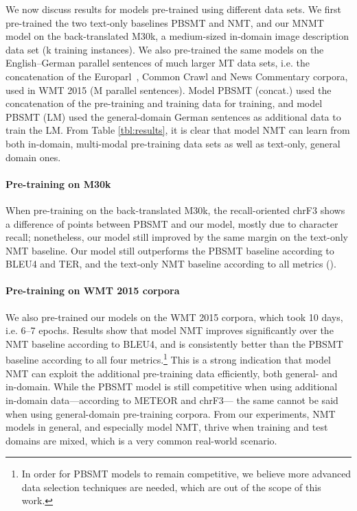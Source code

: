 \documentclass[11pt]{article}
\begin{document}
We now discuss results for models pre-trained using different data sets.
We first pre-trained the two text-only baselines PBSMT and NMT, and our MNMT model on the back-translated M30k, a medium-sized in-domain image description data set (k training instances).
We also pre-trained the same models on the English--German parallel sentences of much larger MT data sets, i.e. the concatenation of the Europarl~\cite{Koehn2005}, Common Crawl and News Commentary corpora, used in WMT 2015 (M parallel sentences).
Model PBSMT (concat.) used the concatenation of the pre-training and training data for training, and model PBSMT (LM) used the general-domain German sentences as additional data to train the LM.
From Table \ref{tbl:results}, it is clear that model NMT can learn from both in-domain, multi-modal pre-training data sets as well as text-only, general domain ones.


\paragraph{Pre-training on M30k}

When pre-training on the back-translated M30k, the recall-oriented chrF3 shows a difference of  points between PBSMT and our model, mostly due to character recall; nonetheless, our model still improved by the same margin on the text-only NMT baseline.
Our model still outperforms the PBSMT baseline according to BLEU4 and TER, and the text-only NMT baseline according to all metrics ().


\paragraph{Pre-training on WMT 2015 corpora}

We also pre-trained our models on the WMT 2015 corpora, which took 10 days, i.e. 6--7 epochs.
Results show that model NMT improves significantly over the NMT baseline according to BLEU4, and is consistently better than the PBSMT baseline according to all four metrics.\footnote{In order for PBSMT models to remain competitive, we believe more advanced data selection techniques are needed, which are out of the scope of this work.}
This is a strong indication that model NMT can exploit the additional pre-training data efficiently, both general- and in-domain.
While the PBSMT model is still competitive when using additional in-domain data---according to METEOR and chrF3--- the same cannot be said when using general-domain pre-training corpora.
From our experiments, NMT models in general, and especially model NMT, thrive when training and test domains are mixed, which is a very common real-world scenario.
\end{document}
